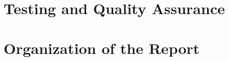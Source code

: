 

\section{Testing and Quality Assurance}
\label{sec:intro-testing-qa}


\section{Organization of the Report}
